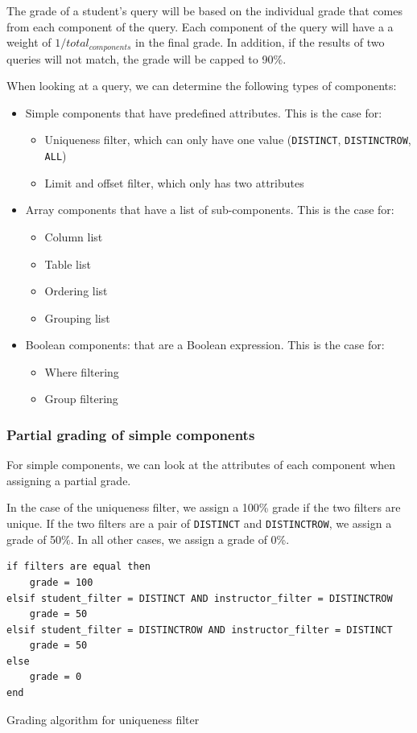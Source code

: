 The grade of a student's query will be based on the individual grade that comes from each component of the query. Each component of the query will have a a weight of $1 / total_{components}$  in the final grade. In addition, if the results of two queries will not match, the grade will be capped to 90\%.

When looking at a query, we can determine the following types of components:

\begin{itemize}
    \item Simple components that have predefined attributes. This is the case for:
        \begin{itemize}
            \item Uniqueness filter, which can only have one value (\texttt{DISTINCT}, \texttt{DISTINCTROW}, \texttt{ALL})
            \item Limit and offset filter, which only has two attributes
        \end{itemize}
    \item Array components that have a list of sub-components. This is the case for:
        \begin{itemize}
            \item Column list
            \item Table list
            \item Ordering list
            \item Grouping list
        \end{itemize}
    \item Boolean components: that are a Boolean expression. This is the case for:
        \begin{itemize}
            \item Where filtering
            \item Group filtering
        \end{itemize}
\end{itemize}

\subsubsection{Partial grading of simple components}

For simple components, we can look at the attributes of each component when assigning a partial grade.

In the case of the uniqueness filter, we assign a 100\% grade if the two filters are unique. If the two filters are a pair of \texttt{DISTINCT} and \texttt{DISTINCTROW}, we assign a grade of 50\%. In all other cases, we assign a grade of 0\%.
\begin{code}
\begin{verbatim}
if filters are equal then
    grade = 100
elsif student_filter = DISTINCT AND instructor_filter = DISTINCTROW
    grade = 50
elsif student_filter = DISTINCTROW AND instructor_filter = DISTINCT
    grade = 50
else
    grade = 0
end
\end{verbatim}
\caption{Grading algorithm for uniqueness filter}
\end{code}

